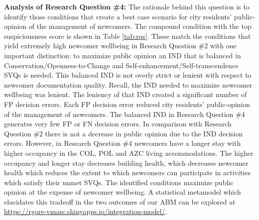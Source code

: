 \documentclass{scspaperproc}
\theoremstyle{scsthe}
\begin{document}
{\bf Analysis of Research Question \#4:} The rationale behind this question is to identify those conditions that create a best case scenario for city residents' public-opinion of the management of newcomers. The compound condition with the top suspiciousness score is shown in Table \ref{tab:rqs}. These match the conditions that yield extremely high newcomer wellbeing in Research Question \#2 with one important distinction: to maximize public opinion an IND that is balanced in Conservation/Openness-to-Change and Self-enhancement/Self-transcendence SVQs is needed. This balanced IND is not overly strict or lenient with respect to newcomer documentation quality. Recall, the IND needed to maximize newcomer wellbeing was lenient.  The leniency of that IND created a significant number of FP decision errors. Each FP decision error reduced city residents' public-opinion of the management of newcomers. The balanced IND in Research Question \#4 generates very few FP or FN decision errors. In comparison with Research Question \#2 there is not a decrease in public opinion due to the IND decision errors. However, in Research Question \#4 newcomers have a longer stay with higher occupancy in the COL, POL and AZC living accommodations. The higher occupancy and longer stay decreases building health, which decreases newcomer health which reduces the extent to which newcomers can participate in activities which satisfy their unmet SVQs. The identified conditions maximize public opinion at the expense of newcomer wellbeing. A statistical metamodel which elucidates this tradeoff in the two outcomes of our ABM can be explored at \url{https://rgore-vmasc.shinyapps.io/integration-model/}. %

\end{document}
